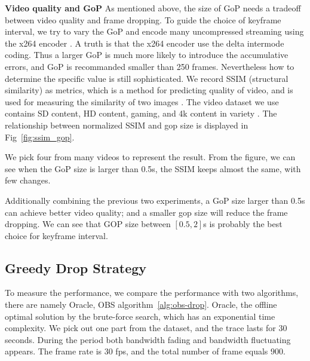 \textbf{Video quality and GoP} As mentioned above, the size of GoP needs a tradeoff between video quality and frame dropping. To guide the choice of keyframe interval, we try to vary the GoP and encode many uncompressed streaming using the x264 encoder \cite{x264}. A truth is that the x264 encoder use the delta intermode coding. Thus a larger GoP is much more likely to introduce the accumulative errors, and GoP is recommanded smaller than 250 frames. Nevertheless how to determine the specific value is still sophisticated. We record SSIM (structural similarity) as metrics, which is a method for predicting quality of video, and is used for measuring the similarity of two images \cite{wang2004image}. The video dataset we use contains SD content, HD content, gaming, and 4k content in variety \cite{video_dataset}. The relationship between normalized SSIM and gop size is displayed in Fig~\ref{fig:ssim_gop}.

We pick four from many videos to represent the result. From the figure, we can see when the GoP size is larger than 0.5s, the SSIM keeps almost the same, with few changes.

Additionally combining the previous two experiments, a GoP size larger than 0.5s can achieve better video quality; and a smaller gop size will reduce the frame dropping. We can see that GOP size between $[0.5,2]$s is probably the best choice for keyframe interval.

\iffalse

\textbf{Varying bitrate.}
To make the conclusion more visible, we fix key frame interval to be 8s and introduce network interruption between 19s and 21s. In different experiments, we provide sufficient network bandwidth and vary the bitrate to be 1000kbps, 1500kbps, 2000kbps, and 2500kbps. The frame drop is shown in Table~\ref{tab:bitrate}. The different bitrates do not make much difference, the number of drop in all cases is about 149.

\textbf{Summary.} We summarize and get conclusions. First, reducing keyframe interval leads to less frame drop. Second, bitrate does not influence frame drop for the short-term case, but the quality of each picture. Preliminary Evaluation points out that a small GoP is one useful try.
\fi

\subsection{Greedy Drop Strategy}
To measure the performance, we compare the performance with two algorithms, there are namely Oracle, OBS algorithm~\ref{alg:obs-drop}. Oracle, the offline optimal solution by the brute-force search, which has an exponential time complexity. We pick out one part from the dataset, and the trace lasts for $30$ seconds. During the period both bandwidth fading and bandwidth fluctuating appears. The frame rate is $30$ fps, and the total number of frame equals $900$.

